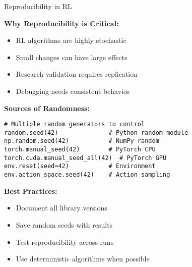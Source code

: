\documentclass[aspectratio=169,10pt]{beamer}
\begin{document}
\begin{frame}[fragile]{Reproducibility in RL}

\textbf{Why Reproducibility is Critical:}
\begin{itemize}
    \item RL algorithms are highly stochastic
    \item Small changes can have large effects
    \item Research validation requires replication
    \item Debugging needs consistent behavior
\end{itemize}

\vfill

\textbf{Sources of Randomness:}
\begin{lstlisting}
# Multiple random generators to control
random.seed(42)              # Python random module
np.random.seed(42)           # NumPy random
torch.manual_seed(42)        # PyTorch CPU
torch.cuda.manual_seed_all(42)  # PyTorch GPU
env.reset(seed=42)           # Environment
env.action_space.seed(42)    # Action sampling
\end{lstlisting}

\vfill

\textbf{Best Practices:}
\begin{itemize}
    \item Document all library versions
    \item Save random seeds with results
    \item Test reproducibility across runs
    \item Use deterministic algorithms when possible
\end{itemize}

\end{frame}
\end{document}

